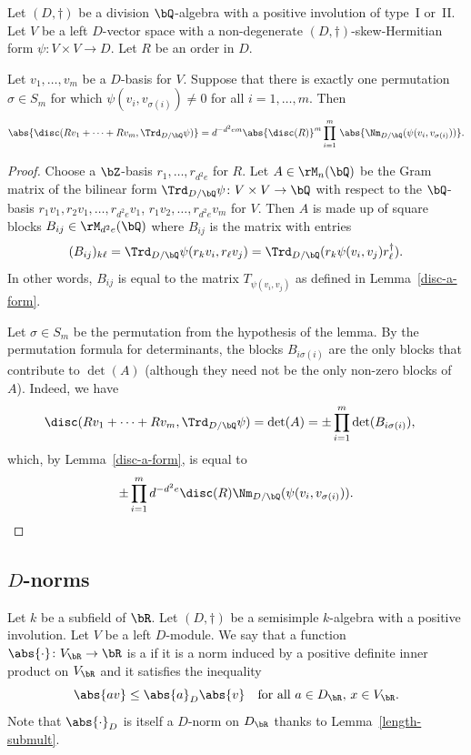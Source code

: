 \begin{lemma} \label{disc-triangular}
Let $(D, \dag)$ be a division $\bQ$-algebra with a positive involution of type~I or~II.
Let $V$ be a left $D$-vector space with a non-degenerate $(D,\dag)$-skew-Hermitian form $\psi \colon V \times V \to D$.
Let $R$ be an order in $D$.

Let $v_1, \dotsc, v_m$ be a $D$-basis for $V$.
Suppose that there is exactly one permutation $\sigma \in S_m$ for which $\psi(v_i, v_{\sigma(i)}) \neq 0$ for all $i = 1, \dotsc, m$.
Then
\[
\abs{\disc(Rv_1 + \dotsb + Rv_m, \Trd_{D/\bQ} \psi)} = d^{-d^2em} \abs{\disc(R)}^m \prod_{i=1}^m\, \abs{\Nm_{D/\bQ}(\psi(v_i, v_{\sigma(i)}))}.
\]
\end{lemma}

\begin{proof}
Choose a $\bZ$-basis $r_1, \dotsc, r_{d^2e}$ for $R$.
Let $A \in \rM_n(\bQ)$ be the Gram matrix of the bilinear form $\Trd_{D/\bQ} \psi \colon V \times V \to \bQ$ with respect to the $\bQ$-basis $r_1 v_1, r_2 v_1, \dotsc, r_{d^2e} v_1$, $r_1 v_2, \dotsc, r_{d^2e} v_m$ for $V$.
Then $A$ is made up of square blocks $B_{ij} \in \rM_{d^2e}(\bQ)$ where $B_{ij}$ is the matrix with entries
\[
(B_{ij})_{k\ell} = \Trd_{D/\bQ} \psi(r_k v_i, r_\ell v_j) = \Trd_{D/\bQ}(r_k\psi(v_i, v_j)r_\ell^\dag).
\]
In other words, $B_{ij}$ is equal to the matrix $T_{\psi(v_i, v_j)}$ as defined in Lemma~\ref{disc-a-form}.

Let $\sigma \in S_m$ be the permutation from the hypothesis of the lemma.
By the permutation formula for determinants, the blocks $B_{i\sigma(i)}$ are the only blocks that
contribute to $\det(A)$ (although they need not be the only non-zero blocks of~$A$).
Indeed, we have
\begin{align*}
\disc(Rv_1 + \dotsb + Rv_m, \Trd_{D/\bQ} \psi)
& = \det(A)
= \pm \prod_{i=1}^m \det(B_{i\sigma(i)}),
\end{align*}
which, by Lemma~\ref{disc-a-form}, is equal to
\[
\pm \prod_{i=1}^m d^{-d^2e} \disc(R) \Nm_{D/\bQ}(\psi(v_i, v_{\sigma(i)})).
\qedhere
\]
\end{proof}

\subsection{\texorpdfstring{$D$}{D}-norms}

Let $k$ be a subfield of $\bR$.
Let $(D,\dag)$ be a semisimple $k$-algebra with a positive involution.
Let $V$ be a left $D$-module.
We say that a function $\abs{\cdot} \colon V_\bR \to \bR$ is a  if it is a norm induced by a positive definite inner product on $V_\bR$ and it satisfies the inequality
\[
\abs{av} \leq \abs{a}_D \abs{v} \quad\text{for all } a \in D_\bR,\, x \in V_\bR.
\]
Note that $\abs{\cdot}_D$ is itself a $D$-norm on $D_\bR$ thanks to Lemma~\ref{length-submult}.

